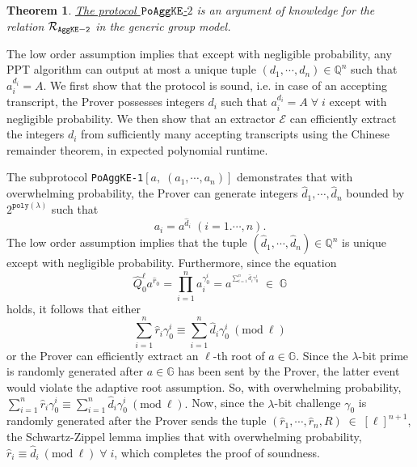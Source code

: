 \documentclass[11pt, lettersize, notitlepage, leqno, footskip=0.6cm]{article}
\newcommand{\bq}{\mathbb Q}
\newcommand{\pl}{\prod\limits}
\newcommand{\slim}{\sum\limits}
\newcommand{\ttt}{\texttt}
\newcommand{\bG}{\mathbb{G}}
\newcommand{\mc}{\mathcal}
\newcommand{\lam}{\lambda}
\newcommand{\what}{\widehat}
\newcommand{\vs}{\vspace{-0.15cm}}
\newcommand{\op}{overwhelming probability}
\newcommand{\np}{negligible probability}
\newcommand{\Mod}[1]{\ (\mathrm{mod}\ #1)}
\newcommand{\E}{\mc{E}}
\newtheorem{Thm}{Theorem}[section]
\numberwithin{equation}{section}
\begin{document}
\vspace{0.2cm}

\begin{Thm} \hyperlink{AggKE-2}{The protocol $\tt{PoAggKE}$-$2$} is an argument of knowledge for the relation $\mc{R}_{{\tt{AggKE-2}}}$ in the generic group model.\end{Thm}

\begin{prf} The low order assumption implies that except with \np, any PPT algorithm can output at most a unique tuple $(d_1,\cdots,d_n)\in\bq^n$ such that $a_i^{d_i} = A$. We first show that the protocol is sound, i.e. in case of an accepting transcript, the Prover possesses integers $d_i$ such that $a_i^{d_i} = A\;\forall\; i$ except with \np. We then show that an extractor $\E$ can efficiently extract the integers $d_i$ from sufficiently many accepting transcripts using the Chinese remainder theorem, in expected polynomial runtime.

The subprotocol \verb|PoAggKE-1|$[a,\;(a_1,\cdots,a_n)]$ demonstrates that with \op, the Prover can generate integers $\what{d}_1,\cdots,\what{d}_n$ bounded by $2^{\ttt{poly}(\lam)}$ such that \vs $$a_i = a^{\what{d}_i}\; (i=1.\cdots,n).$$ The low order assumption implies that the tuple $(\what{d}_1,\cdots,\what{d}_n)\in\bq^n$ is unique except with \np. Furthermore, since the equation \vs $$\what{Q}_0^{\ell}a^{\what{r}_0} = \pl_{i=1}^{n} a_i^{\gamma_{0}^i}  = a^{^{\slim_{i=1}^n \what{d}_i\gamma_{0}^i}}\;\in\;\bG$$ holds, it follows that either \vs $$\slim_{i=1}^n\what{r}_i\gamma_{0}^i\equiv \slim_{i=1}^n \what{d}_i\gamma_{0}^i\Mod{\ell}$$ or the Prover can efficiently extract an $\ell$-th root of $a\in\bG$. Since the $\lam$-bit prime is randomly generated after $a\in\bG$ has been sent by the Prover, the latter event would violate the adaptive root assumption. So, with \op, $\slim_{i=1}^n\what{r}_i\gamma_{0}^i\equiv \slim_{i=1}^n \what{d}_i\gamma_{0}^i\Mod{\ell}.$ Now, since the $\lam$-bit challenge $\gamma_{0}$ is randomly generated after the Prover sends the tuple $(\what{r}_1,\cdots,\what{r}_n, R)\;\in\;[\ell]^{n+1}$, the Schwartz-Zippel lemma implies that with \op, $\what{r}_i\equiv \what{d}_i\Mod{\ell}\;\forall\; i$, which completes the proof of soundness.


\end{prf}
\end{document}
